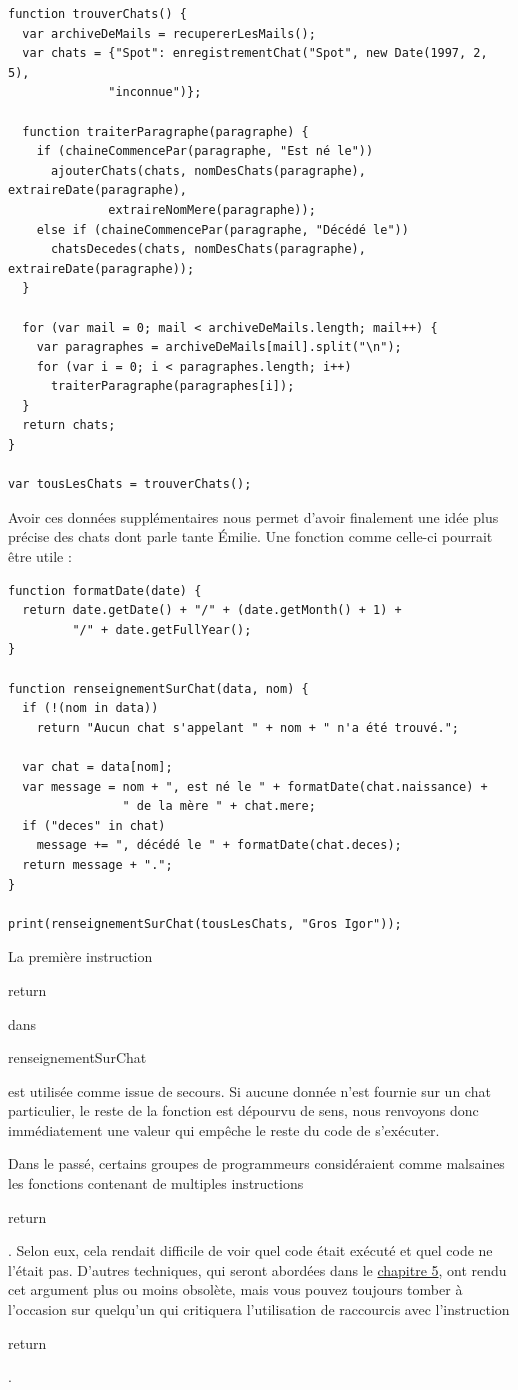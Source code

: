 \documentclass{FramateX}
\renewcommand{\texttt}[1]{\begin{sffamily}{#1}\end{sffamily}}
\begin{document}
\begin{lstlisting}
function trouverChats() {
  var archiveDeMails = recupererLesMails();
  var chats = {"Spot": enregistrementChat("Spot", new Date(1997, 2, 5),
              "inconnue")};

  function traiterParagraphe(paragraphe) {
    if (chaineCommencePar(paragraphe, "Est né le"))
      ajouterChats(chats, nomDesChats(paragraphe), extraireDate(paragraphe),
              extraireNomMere(paragraphe));
    else if (chaineCommencePar(paragraphe, "Décédé le"))
      chatsDecedes(chats, nomDesChats(paragraphe), extraireDate(paragraphe));
  }

  for (var mail = 0; mail < archiveDeMails.length; mail++) {
    var paragraphes = archiveDeMails[mail].split("\n");
    for (var i = 0; i < paragraphes.length; i++)
      traiterParagraphe(paragraphes[i]);
  }
  return chats;
}

var tousLesChats = trouverChats();
\end{lstlisting}
Avoir ces données supplémentaires nous permet d'avoir finalement une
idée plus précise des chats dont parle tante Émilie. Une fonction comme
celle-ci pourrait être utile :

\begin{lstlisting}
function formatDate(date) {
  return date.getDate() + "/" + (date.getMonth() + 1) +
         "/" + date.getFullYear();
}

function renseignementSurChat(data, nom) {
  if (!(nom in data))
    return "Aucun chat s'appelant " + nom + " n'a été trouvé.";

  var chat = data[nom];
  var message = nom + ", est né le " + formatDate(chat.naissance) +
                " de la mère " + chat.mere;
  if ("deces" in chat)
    message += ", décédé le " + formatDate(chat.deces);
  return message + ".";
}

print(renseignementSurChat(tousLesChats, "Gros Igor"));
\end{lstlisting}
La première instruction \texttt{return} dans
\texttt{renseignementSurChat} est utilisée comme issue de secours. Si
aucune donnée n'est fournie sur un chat particulier, le reste de la
fonction est dépourvu de sens, nous renvoyons donc immédiatement une
valeur qui empêche le reste du code de s'exécuter.

Dans le passé, certains groupes de programmeurs considéraient comme
malsaines les fonctions contenant de multiples instructions
\texttt{return}. Selon eux, cela rendait difficile de voir quel code
était exécuté et quel code ne l'était pas. D'autres techniques, qui
seront abordées dans le \href{chapter5.html}{chapitre 5}, ont rendu cet
argument plus ou moins obsolète, mais vous pouvez toujours tomber à
l'occasion sur quelqu'un qui critiquera l'utilisation de raccourcis avec
l'instruction \texttt{return}.
\end{document}
